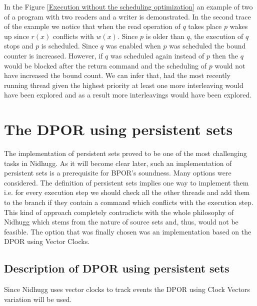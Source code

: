 In the Figure \ref{Execution without the scheduling optimization} an example of two of a program with two readers and a writer is demonstrated.
In the second trace of the example we notice that when the read operation of $q$ takes place $p$ wakes up since $r(x)$ conflicts with $w(x)$. Since $p$
is older than $q$, the execution of $q$ stops and $p$ is scheduled. Since $q$ was enabled when $p$ was scheduled the bound counter is increased. However,
if $q$ was scheduled again instead of $p$ then the $q$ would be blocked after the return command and the scheduling of $p$ would not have increased the 
bound count. We can infer that, had the most recently running thread given the highest priority at least one more interleaving would have
been explored and as a result more interleavings would have been explored.

\section{The DPOR using persistent sets}

The implementation of persistent sets proved to be one of the most challenging tasks in Nidhugg. As it will become clear later, such an implementation
of persistent sets is a prerequisite for BPOR's soundness. Many options were considered. The definition of persistent sets implies one way to implement them i.e. for every execution step we should
check all the other threads and add them to the branch if they contain a command which conflicts with the execution step. This kind of approach
completely contradicts with the whole philosophy of Nidhugg which stems from the nature of source sets and, thus, would not be feasible. 
The option that was finally chosen was an implementation based on the DPOR using Vector Clocks.

\subsection{Description of DPOR using persistent sets}

Since Nidhugg uses vector clocks to track events the DPOR using Clock Vectors variation will be used.

